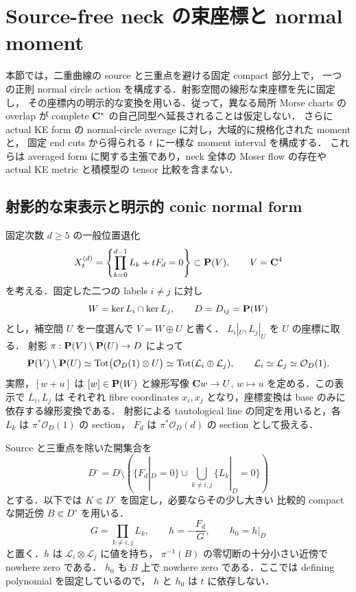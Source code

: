 \section{Source-free neck の束座標と normal moment}
\label{pair:sec:source-free-neck-coordinates}

本節では，二重曲線の source と三重点を避ける固定 compact 部分上で，
一つの正則 normal circle action を構成する．射影空間の線形な束座標を先に固定し，
その座標内の明示的な変換を用いる．従って，異なる局所 Morse charts の overlap が
complete $\mathbf C^*$ の自己同型へ延長されることは仮定しない．
さらに actual KE form の normal-circle average に対し，大域的に規格化された moment と，
固定 end cuts から得られる $t$ に一様な moment interval を構成する．
これらは averaged form に関する主張であり，neck 全体の Moser flow の存在や
actual KE metric と積模型の tensor 比較を含まない．

\subsection{射影的な束表示と明示的 conic normal form}

固定次数 $d\ge5$ の一般位置退化
\[
 X_t^{(d)}=\left\{\prod_{k=0}^{d-1}L_k+tF_d=0\right\}\subset\mathbf P(V),
 \qquad V=\mathbf C^4
\]
を考える．固定した二つの labels $i\ne j$ に対し
\[
 W=\ker L_i\cap\ker L_j,\qquad D=D_{ij}=\mathbf P(W)
\]
とし，補空間 $U$ を一度選んで $V=W\oplus U$ と書く．
$L_i|_U,L_j|_U$ を $U$ の座標に取る．
射影 $\pi:\mathbf P(V)\setminus\mathbf P(U)\to D$ によって
\begin{equation}\label{pair:eq:projective-bundle}
 \mathbf P(V)\setminus\mathbf P(U)
 \simeq\operatorname{Tot}\bigl(\mathcal O_D(1)\otimes U\bigr)
 \simeq\operatorname{Tot}(\mathcal L_i\oplus\mathcal L_j),
 \qquad \mathcal L_i\simeq\mathcal L_j\simeq\mathcal O_D(1).
\end{equation}
実際，$[w+u]$ は $[w]\in\mathbf P(W)$ と線形写像
$\mathbf C w\to U$, $w\mapsto u$ を定める．この表示で $L_i,L_j$ は
それぞれ fibre coordinates $x_i,x_j$ となり，座標変換は base のみに依存する線形変換である．
射影による tautological line の同定を用いると，各 $L_k$ は $\pi^*\mathcal O_D(1)$ の section，
$F_d$ は $\pi^*\mathcal O_D(d)$ の section として扱える．

Source と三重点を除いた開集合を
\[
 D^\circ=D\setminus
 \left(\{F_d|_D=0\}\cup\bigcup_{k\ne i,j}\{L_k|_D=0\}\right)
\]
とする．以下では $K\Subset D^\circ$ を固定し，必要ならその少し大きい
比較的 compact な開近傍 $B\Subset D^\circ$ を用いる．
\begin{equation}\label{pair:eq:normal-unit}
 G=\prod_{k\ne i,j}L_k,\qquad
 h=-\frac{F_d}{G},\qquad h_0=h|_D
\end{equation}
と置く．$h$ は $\mathcal L_i\otimes\mathcal L_j$ に値を持ち，
$\pi^{-1}(B)$ の零切断の十分小さい近傍で nowhere zero である．
$h_0$ も $B$ 上で nowhere zero である．ここでは defining polynomial を固定しているので，
$h$ と $h_0$ は $t$ に依存しない．

